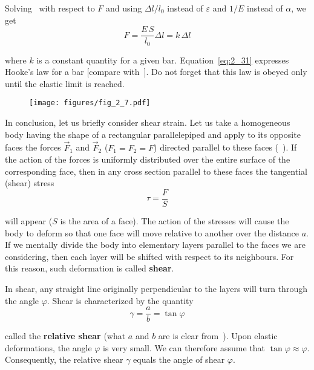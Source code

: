 Solving~ with respect to $F$ and using $\Delta l/l_0$ instead of $\varepsilon$ and $1/E$ instead of $\alpha$, we get
\begin{equation}\label{eq:2_31}
F = \frac{E\,S}{l_0}\Delta l = k\,\Delta l
\end{equation}

\noindent
where $k$ is a constant quantity for a given bar. Equation~\eqref{eq:2_31} expresses Hooke's law for a bar [compare with~]. Do not forget that this law is obeyed only until the elastic limit is reached. 

\begin{figure}[t]
	\begin{center}
		\texttt{[image: figures/fig\_2\_7.pdf]}
		\caption[]{}
		\label{fig:2_7}
	\end{center}
	\vspace{-0.7cm}
\end{figure}

In conclusion, let us briefly consider shear strain. Let us take a homogeneous body having the shape of a rectangular parallelepiped and apply to its opposite faces the forces $\vec{F}_1$ and $\vec{F}_2$ ($F_1=F_2=F$) directed parallel to these faces (~). If the action of the forces is uniformly distributed over the entire surface of the corresponding face, then in any cross section parallel to these faces the tangential (shear) stress
\begin{equation}\label{eq:2_32}
\tau = \frac{F}{S}
\end{equation}

\noindent
will appear ($S$ is the area of a face). The action of the stresses will cause the body to deform so that one face will move relative to another over the distance $a$. If we mentally divide the body into elementary layers parallel to the faces we are considering, then each layer will be shifted with respect to its neighbours. For this reason, such deformation is called \textbf{shear}.

In shear, any straight line originally perpendicular to the layers will turn through the angle $\varphi$. Shear is characterized by the quantity
\begin{equation}\label{eq:2_33}
\gamma = \frac{a}{b} = \tan\varphi
\end{equation}

\noindent
called the \textbf{relative shear} (what $a$ and $b$ are is clear from~). Upon elastic deformations, the angle $\varphi$ is very small. We can therefore assume that $\tan\varphi\approx\varphi$. Consequently, the relative shear $\gamma$ equals the angle of shear $\varphi$.

